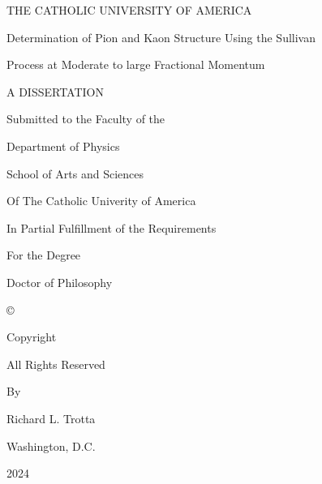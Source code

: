 \begin{titlepage}
  \centering
  {\Large THE CATHOLIC UNIVERSITY OF AMERICA\par}
  \vspace{1cm}
  {\Large Determination of Pion and Kaon Structure Using the Sullivan\par
    Process at Moderate to large Fractional Momentum \par}
  \vspace{1cm}
  {\Large A DISSERTATION\par}
  \vspace{2cm}
  {\Large  Submitted to the Faculty of the\par
    Department of Physics\par
    School of Arts and Sciences\par
    Of The Catholic Univerity of America\par
    In Partial Fulfillment of the Requirements\par
    For the Degree\par
    Doctor of Philosophy\par}
  \vspace{2cm}
  {\Large \copyright\par
    Copyright\par
    All Rights Reserved\par}
  {\Large By\par}
  {\Large Richard L. Trotta\par}
  {\Large Washington, D.C.\par}
  {\Large 2024}
\end{titlepage}
